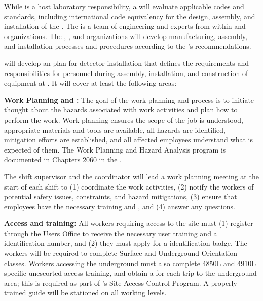 
While  is  a host laboratory responsibility, a   will evaluate applicable codes and standards, including international code equivalency for the design, assembly, and installation of the  . The  is a team of engineering and  experts from within  and  organizations.  The , , and  organizations will develop manufacturing, assembly, and installation processes and procedures according to the 's recommendations. 

 will develop an   plan for detector  installation that defines  
the  requirements and responsibilities for personnel during  assembly, installation, and construction of equipment at . It will cover at least the following areas:

{\bf Work Planning and :} The goal of the work planning and  process is to initiate thought about the hazards associated with work activities and plan how to perform the work. Work planning ensures the scope of the job is understood, appropriate materials and tools are available, all hazards are identified, mitigation efforts are established, and all affected employees understand what is expected of them. 
The Work Planning and Hazard Analysis program is documented in Chapters 2060 in the .

The shift supervisor and the  coordinator  will lead a work planning meeting at the start of each shift  to (1) coordinate the work activities, (2) notify the workers of potential safety issues, constraints, and hazard mitigations, (3) ensure that employees have the necessary  training and , and (4) answer any questions.

{\bf Access and training:}  All  workers requiring access to the  site must (1) register through the  Users Office to receive the necessary user training and a  identification number, and (2) they must apply for a  identification badge. 
The workers will be required to complete  Surface and Underground Orientation classes. Workers accessing the underground must also complete 4850L and 4910L specific unescorted access training, and obtain a  for each trip to the underground area; this is required as part of 's Site Access Control Program. 
A properly trained guide will be stationed on all working levels. 

